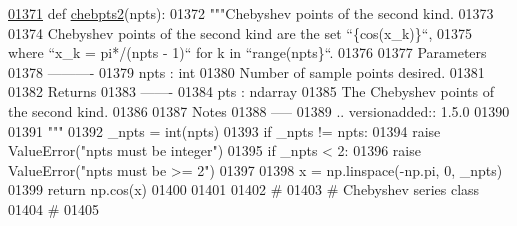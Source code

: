 \begin{DoxyCode}
\hypertarget{namespacepyneb_1_1utils_1_1chebyshev_l01371}{}\hyperlink{namespacepyneb_1_1utils_1_1chebyshev_a224bc370de0cfa204c3ac15d626d13e3}{01371} \textcolor{keyword}{def }\hyperlink{namespacepyneb_1_1utils_1_1chebyshev_a224bc370de0cfa204c3ac15d626d13e3}{chebpts2}(npts):
01372     \textcolor{stringliteral}{"""Chebyshev points of the second kind.}
01373 \textcolor{stringliteral}{}
01374 \textcolor{stringliteral}{    Chebyshev points of the second kind are the set ``\{cos(x\_k)\}``,}
01375 \textcolor{stringliteral}{    where ``x\_k = pi*/(npts - 1)`` for k in ``range(npts\}``.}
01376 \textcolor{stringliteral}{}
01377 \textcolor{stringliteral}{    Parameters}
01378 \textcolor{stringliteral}{    ----------}
01379 \textcolor{stringliteral}{    npts : int}
01380 \textcolor{stringliteral}{        Number of sample points desired.}
01381 \textcolor{stringliteral}{}
01382 \textcolor{stringliteral}{    Returns}
01383 \textcolor{stringliteral}{    -------}
01384 \textcolor{stringliteral}{    pts : ndarray}
01385 \textcolor{stringliteral}{        The Chebyshev points of the second kind.}
01386 \textcolor{stringliteral}{}
01387 \textcolor{stringliteral}{    Notes}
01388 \textcolor{stringliteral}{    -----}
01389 \textcolor{stringliteral}{    .. versionadded:: 1.5.0}
01390 \textcolor{stringliteral}{}
01391 \textcolor{stringliteral}{    """}
01392     \_npts = int(npts)
01393     \textcolor{keywordflow}{if} \_npts != npts:
01394         \textcolor{keywordflow}{raise} ValueError(\textcolor{stringliteral}{"npts must be integer"})
01395     \textcolor{keywordflow}{if} \_npts < 2:
01396         \textcolor{keywordflow}{raise} ValueError(\textcolor{stringliteral}{"npts must be >= 2"})
01397 
01398     x = np.linspace(-np.pi, 0, \_npts)
01399     \textcolor{keywordflow}{return} np.cos(x)
01400 
01401 
01402 \textcolor{comment}{#}
01403 \textcolor{comment}{# Chebyshev series class}
01404 \textcolor{comment}{#}
01405 
\end{DoxyCode}
\hypertarget{namespacepyneb_1_1utils_1_1chebyshev_a2f01a14e36b415a2f3ebc67c95cceb26}{}
